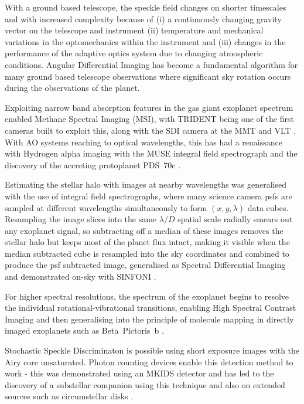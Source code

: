 \documentclass[letterpaper]{ar-1col}
\newcommand{\ld}{$\lambda/D$}
\begin{document}
With a ground based telescope, the speckle field changes on shorter timescales and with increased complexity because of (i) a continuously changing gravity vector on the telescope and instrument (ii) temperature and mechanical variations in the optomechanics within the instrument and (iii) changes in the performance of the adaptive optics system due to changing atmospheric conditions.
%
Angular Differential Imaging \citep[ADI; ][]{Marois06} has become a fundamental algorithm for many ground based telescope observations where significant sky rotation occurs during the observations of the planet.

Exploiting narrow band absorption features in the gas giant exoplanet spectrum enabled Methane Spectral Imaging (MSI), with TRIDENT \citep{Marois05} being one of the first cameras built to exploit this, along with the SDI camera at the MMT and VLT \citep{Biller07-1}.
%
With AO systems reaching to optical wavelengths, this has had a renaissance with Hydrogen alpha imaging with the MUSE integral field spectrograph and the discovery of the accreting protoplanet PDS~70c \citep{Haffert19}.

Estimating the stellar halo with images at nearby wavelengths was generalised with the use of integral field spectrographs, where many science camera \acp{psf} are sampled at different wavelengths simultaneously to form $(x,y,\lambda)$ data cubes.
%
Resampling the image slices into the same \ld{} spatial scale radially smears out any exoplanet signal, so subtracting off a median of these images removes the stellar halo but keeps most of the planet flux intact, making it visible when the median subtracted cube is resampled into the sky coordinates and combined to produce the \ac{psf} subtracted image, generalised as Spectral Differential Imaging \cite[SDI; ][]{Sparks02} and demonstrated on-sky with SINFONI \citep{Thatte07}.

For higher spectral resolutions, the spectrum of the exoplanet begins to resolve the individual rotational-vibrational transitions, enabling High Spectral Contrast Imaging \citep[including the detection of HD~209458b ][]{Snellen10} and then generalising into the principle of molecule mapping in directly imaged exoplanets such as Beta~Pictoris~b \citep{Hoeijmakers18}.

Stochastic Speckle Discriminaton \citep[SSD; ][]{Gladysz09} is possible using short exposure images with the Airy core unsaturated.
%
Photon counting devices enable this detection method to work - this was demonstrated using an MKIDS detector and has led to the discovery of a substellar companion using this technique \citep{Steiger21} and also on extended sources such as circumstellar disks \citep{Steiger22}.
\end{document}
